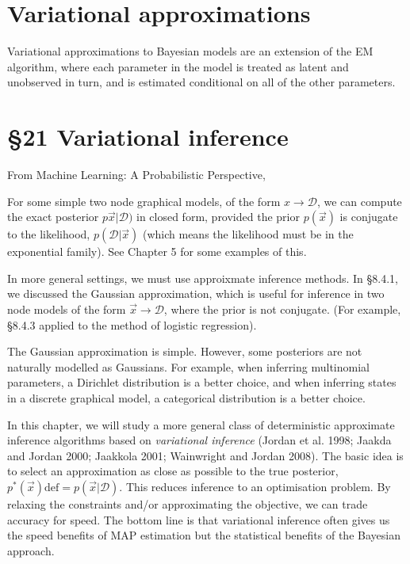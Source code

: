 \documentclass{amsart}
\begin{document}
\section{Variational approximations}
Variational approximations to Bayesian models are an extension of the EM algorithm,
where each parameter in the model is treated as latent and unobserved in turn, and is
estimated conditional on all of the other parameters.

\section{\S 21 Variational inference}

From Machine Learning: A Probabilistic Perspective,

For some simple two node graphical models, of the form $x \to \mathcal{D}$, we can compute
the exact posterior $p\vec{x}|\mathcal{D})$ in closed form, provided the prior $p(\vec{x})$ 
is conjugate to the likelihood, $p(\mathcal{D}|\vec{x})$ (which means the likelihood must
be in the exponential family). See Chapter 5 for some examples of this.

In more general settings, we must use approixmate inference methods. In \S 8.4.1, we
discussed the Gaussian approximation, which is useful for inference in two node models of
the form $\vec{x} \to \mathcal{D}$, where the prior is not conjugate. (For example, 
\S 8.4.3 applied to the method of logistic regression).

The Gaussian approximation is simple. However, some posteriors are not naturally modelled as
Gaussians. For example, when inferring multinomial parameters, a Dirichlet
distribution is a better choice, and when inferring states in a discrete graphical model,
a categorical distribution is a better choice.

In this chapter, we will study a more general class of deterministic approximate inference
algorithms based on \emph{variational inference} (Jordan et al. 1998; Jaakda and Jordan 
2000; Jaakkola 2001; Wainwright and Jordan 2008). The basic idea is to select an approximation
as close as possible to the true posterior,
$p^{*}(\vec{x}) \text{def} = p(\vec{x}|\mathcal{D})$. This reduces inference to an 
optimisation problem. By relaxing the constraints and/or approximating the objective, we can
trade accuracy for speed. The bottom line is that variational inference often gives us the
speed benefits of MAP estimation but the statistical benefits of the Bayesian approach.
\end{document}
